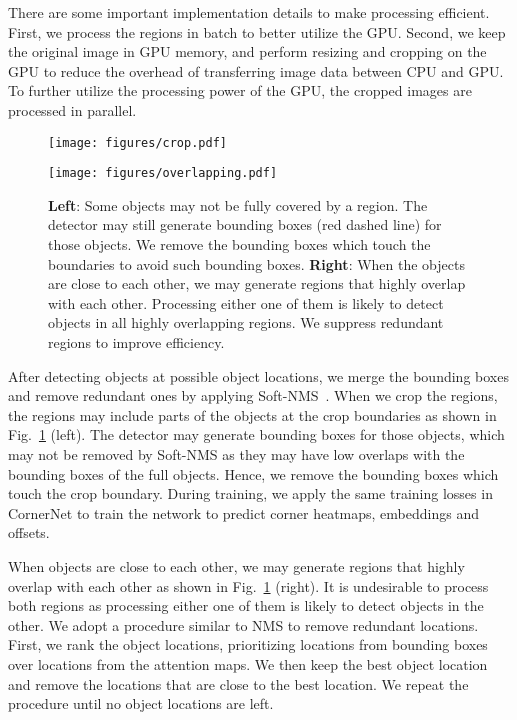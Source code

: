 \documentclass{bmvc2k}
\begin{document}
There are some important implementation details to make processing efficient. First, we process the regions in batch to better utilize the GPU. Second, we keep the original image in GPU memory, and perform resizing and cropping on the GPU to reduce the overhead of transferring image data between CPU and GPU. To further utilize the processing power of the GPU, the cropped images are processed in parallel.

\begin{figure}[t]
    \centering
    \begin{minipage}[t]{0.47\textwidth}
        \centering
        \texttt{[image: figures/crop.pdf]}
    \end{minipage}
    \hfill
    \begin{minipage}[t]{0.51\textwidth}
        \centering
        \texttt{[image: figures/overlapping.pdf]}
    \end{minipage}
    \caption{\textbf{Left}: Some objects may not be fully covered by a region. The detector may still generate bounding boxes (red dashed line) for those objects. We remove the bounding boxes which touch the boundaries to avoid such bounding boxes. \textbf{Right}: When the objects are close to each other, we may generate regions that highly overlap with each other. Processing either one of them is likely to detect objects in all highly overlapping regions. We suppress redundant regions to improve efficiency.}
    \label{fig:crop_and_overlap}
    \vspace{-3mm}
\end{figure}

After detecting objects at possible object locations, we merge the bounding boxes and remove redundant ones by applying Soft-NMS~\cite{bodla2017soft}. When we crop the regions, the regions may include parts of the objects at the crop boundaries as shown in Fig.~\ref{fig:crop_and_overlap} (left). The detector may generate bounding boxes for those objects, which may not be removed by Soft-NMS as they may have low overlaps with the bounding boxes of the full objects. Hence, we remove the bounding boxes which touch the crop boundary. During training, we apply the same training losses in CornerNet to train the network to predict corner heatmaps, embeddings and offsets.

When objects are close to each other, we may generate regions that highly overlap with each other as shown in Fig.~\ref{fig:crop_and_overlap} (right). It is undesirable to process both regions as processing either one of them is likely to detect objects in the other. We adopt a procedure similar to NMS to remove redundant locations. First, we rank the object locations, prioritizing locations from bounding boxes over locations from the attention maps. We then keep the best object location and remove the locations that are close to the best location. We repeat the procedure until no object locations are left.
\end{document}
